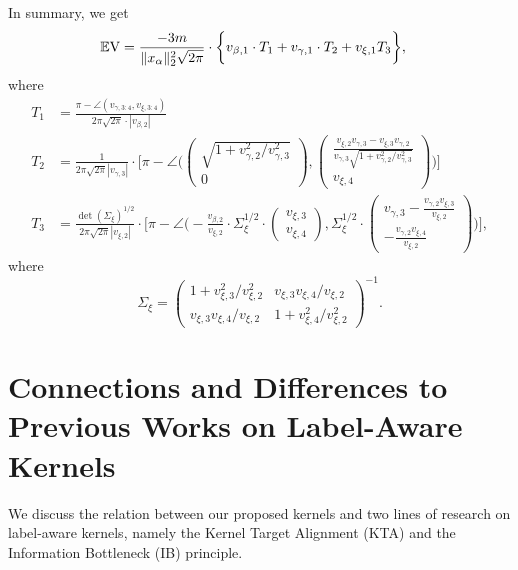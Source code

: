 In summary, we get
\begin{align*}
	\bbE \RN{5} & = \frac{-3m}{\|x_\alpha \|_2^2 \sqrt{2\pi}} \cdot \bigg\{ v_{\beta, 1} \cdot T_1 + v_{\gamma, 1} \cdot T_2 + v_{\xi, 1} T_3 \bigg\},
\end{align*}
where 
\begin{align*}
	T_1 & = \frac{\pi - \angle(v_{\gamma, 3:4}, v_{\xi, 3:4})}{2\pi\sqrt{2\pi} \cdot |v_{\beta, 2}|} \\
	T_2 & = \frac{1}{2\pi\sqrt{2\pi}|v_{\gamma, 3}|}  \cdot \bigg[\pi - \angle\bigg(
	\begin{pmatrix}
		\sqrt{1+ v_{\gamma, 2}^2 / v_{\gamma, 3}^2} \\
		0
	\end{pmatrix},
	\begin{pmatrix}
		\frac{v_{\xi, 2}v_{\gamma, 3} - v_{\xi, 3}v_{\gamma, 2}}{v_{\gamma, 3}\sqrt{1+ v_{\gamma, 2}^2 / v_{\gamma, 3}^2}} \\
		 v_{\xi, 4}
	\end{pmatrix} \bigg)\bigg] \\
	T_3 & = \frac{\det(\Sigma_\xi)^{1/2}}{2\pi\sqrt{2\pi} |v_{\xi, 2}|} \cdot \bigg[\pi - \angle\bigg( -\frac{v_{\beta, 2}}{v_{\xi, 2}} \cdot  \Sigma_\xi^{1/2} \cdot 
	\begin{pmatrix}
		v_{\xi, 3} \\
		v_{\xi, 4}
	\end{pmatrix}, 
	\Sigma_{\xi}^{1/2}\cdot
	\begin{pmatrix}
		v_{\gamma, 3} - \frac{v_{\gamma, 2} v_{\xi, 3}}{v_{\xi, 2}}\\
		- \frac{v_{\gamma, 2} v_{\xi, 4}}{v_{\xi, 2}}
	\end{pmatrix}
	\bigg)
	\bigg],
\end{align*}	
where
\[
	\Sigma_\xi =\begin{pmatrix}
		1 + v_{\xi, 3}^2/v_{\xi, 2}^2 & v_{\xi, 3} v_{\xi, 4} / v_{\xi, 2} \\
		v_{\xi, 3} v_{\xi, 4} / v_{\xi, 2} & 1 + v_{\xi, 4}^2 / v_{\xi, 2}^2
	\end{pmatrix}^{-1}. 
\]


\section{Connections and Differences to Previous Works on Label-Aware Kernels}\label{append:connections}
We discuss the relation between our proposed kernels and two lines of research on label-aware kernels, namely the Kernel Target Alignment (KTA) and the Information Bottleneck (IB) principle. 

